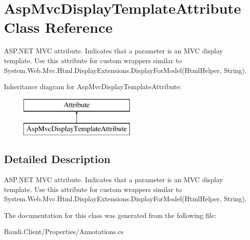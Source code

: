 \hypertarget{class_asp_mvc_display_template_attribute}{}\section{Asp\+Mvc\+Display\+Template\+Attribute Class Reference}
\label{class_asp_mvc_display_template_attribute}


A\+S\+P.\+N\+E\+T M\+V\+C attribute. Indicates that a parameter is an M\+V\+C display template. Use this attribute for custom wrappers similar to {\ttfamily System.\+Web.\+Mvc.\+Html.\+Display\+Extensions.\+Display\+For\+Model(\+Html\+Helper, String)}.  


Inheritance diagram for Asp\+Mvc\+Display\+Template\+Attribute\+:\begin{figure}[H]
\begin{center}
\leavevmode
\includegraphics[height=2.000000cm]{class_asp_mvc_display_template_attribute}
\end{center}
\end{figure}


\subsection{Detailed Description}
A\+S\+P.\+N\+E\+T M\+V\+C attribute. Indicates that a parameter is an M\+V\+C display template. Use this attribute for custom wrappers similar to {\ttfamily System.\+Web.\+Mvc.\+Html.\+Display\+Extensions.\+Display\+For\+Model(\+Html\+Helper, String)}. 



The documentation for this class was generated from the following file\+:\begin{DoxyCompactItemize}
\item 
Baudi.\+Client/\+Properties/Annotations.\+cs\end{DoxyCompactItemize}
